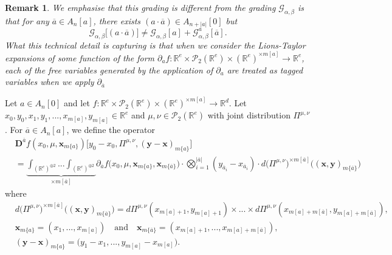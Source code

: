 \documentclass[a4paper,11pt,twoside]{article}
\numberwithin{equation}{section}
\theoremstyle{plain}
\newtheorem{remark}[theorem]{Remark}
\newcommand{\bR}{\mathbb{R}}
\newcommand{\cP}{\mathcal{P}}
\newcommand{\scG}{\mathscr{G}}
\newcommand{\rD}{\mathbf{D}}
\newcommand{\1}{\mathbbm{1}}
\begin{document}
	\begin{remark}
		\label{remark:Link-G+G^a}
		We emphasise that this grading is different from the grading $\scG_{\alpha, \beta}$ is that for any $\overline{a} \in A_n[a]$, there exists $(a \cdot \overline{a} ) \in A_{n + |a|}[0]$ but 
		$$
		\scG_{\alpha, \beta}\big[ (a\cdot \overline{a}) \big] \neq \scG_{\alpha, \beta}[a] + \scG_{\alpha, \beta}^a[\overline{a}]. 
		$$
		What this technical detail is capturing is that when we consider the Lions-Taylor expansions of some function of the form $\partial_a f:\bR^e \times \cP_2(\bR^e) \times (\bR^e)^{\times m[a]} \to \bR^e$, each of the free variables generated by the application of $\partial_a$ are treated as tagged variables when we apply $\partial_{\overline{a}}$
	\end{remark}
	
	Let $a\in A_{n}[0]$ and let $f:\bR^e \times \cP_2(\bR^e) \times (\bR^e)^{\times m[a]} \to \bR^d$. Let $x_0, y_0, x_1, y_1, ..., x_{m[a]}, y_{m[a]} \in \bR^e$ and $\mu , \nu \in \cP_2(\bR^e)$ with joint distribution $\Pi^{\mu, \nu}$. For $\overline{a} \in A_n[a]$, we define the operator
	\begin{align}
		\nonumber
		&\rD^{\overline{a}} f(x_0, \mu, \boldsymbol{x}_{m\{a\}} )\big[ y_0-x_0, \Pi^{\mu, \nu},  (\boldsymbol{y}-\boldsymbol{x})_{m\{a\}} \big]
		\\
		&= \underbrace{\int_{(\bR^e)^{\oplus 2}} ... \int_{(\bR^e)^{\oplus 2}}}_{\times m[\overline{a}]} \partial_{\overline{a}} f\Big( x_0, \mu, \boldsymbol{x}_{m\{a\}}, \boldsymbol{x}_{m\{ \overline{a} \} }\Big) 
		\cdot 
		\bigotimes_{i=1}^{|\overline{a}|} (y_{\overline{a}_i} - x_{\overline{a}_i}) \cdot d\big( \Pi^{\mu, \nu} \Big)^{\times m[\overline{a}]} \Big( (\boldsymbol{x}, \boldsymbol{y})_{m\{\overline{a}\} } \Big)
	\end{align}
	where
	\begin{align*}
		&d\big( \Pi^{\mu, \nu}\big)^{\times m[\overline{a}]}\Big( (\boldsymbol{x}, \boldsymbol{y})_{m\{\overline{a}\} } \Big) = d\Pi^{\mu, \nu}(x_{m[a]+1}, y_{m[a]+1}) \times ... \times d\Pi^{\mu, \nu}(x_{m[a]+m[\overline{a}]}, y_{m[a]+m[\overline{a}]}), 
		\\
		&\boldsymbol{x}_{m\{a\}} = (x_1, ..., x_{m[a]}) \quad \mbox{and}\quad \boldsymbol{x}_{m\{\overline{a}\}} = (x_{m[a]+1}, ..., x_{m[a] + m[\overline{a}]}), 
		\\
		&(\boldsymbol{y}-\boldsymbol{x})_{m\{a\}} = \big( y_1 - x_1, ..., y_{m[a]} - x_{m[a]} \big). 
	\end{align*}
	
\end{document}
